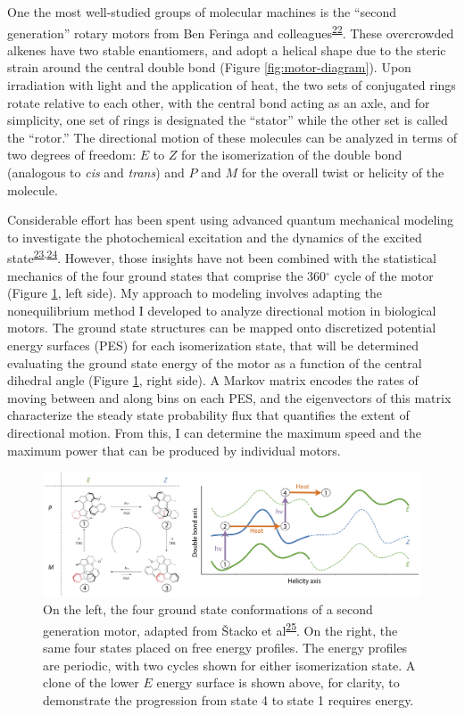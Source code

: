 \documentclass[11pt,notitlepage]{article}
\begin{document}
One the most well-studied groups of molecular machines is the ``second
generation'' rotary motors from Ben Feringa and
colleagues\textsuperscript{\protect\hyperlink{ref-FwAqK1Dt}{22}}. These
overcrowded alkenes have two stable enantiomers, and adopt a helical
shape due to the steric strain around the central double bond (Figure
\ref{fig:motor-diagram}). Upon irradiation with light and the
application of heat, the two sets of conjugated rings rotate relative to
each other, with the central bond acting as an axle, and for simplicity,
one set of rings is designated the ``stator'' while the other set is
called the ``rotor.'' The directional motion of these molecules can be
analyzed in terms of two degrees of freedom: \(E\) to \(Z\) for the
isomerization of the double bond (analogous to \emph{cis} and
\emph{trans}) and \(P\) and \(M\) for the overall twist or helicity of
the molecule.

Considerable effort has been spent using advanced quantum mechanical
modeling to investigate the photochemical excitation and the dynamics of
the excited
state\textsuperscript{\protect\hyperlink{ref-so4s7d25}{23},\protect\hyperlink{ref-N6pRFM85}{24}}.
However, those insights have not been combined with the statistical
mechanics of the four ground states that comprise the 360\(^\circ\)
cycle of the motor (Figure \ref{fig:motors}, left side). My approach to
modeling involves adapting the nonequilibrium method I developed to
analyze directional motion in biological motors. The ground state
structures can be mapped onto discretized potential energy surfaces
(PES) for each isomerization state, that will be determined evaluating
the ground state energy of the motor as a function of the central
dihedral angle (Figure \ref{fig:motors}, right side). A Markov matrix
encodes the rates of moving between and along bins on each PES, and the
eigenvectors of this matrix characterize the steady state probability
flux that quantifies the extent of directional motion. From this, I can
determine the maximum speed and the maximum power that can be produced
by individual motors.

\begin{figure}
\centering
\includegraphics[width=1\textwidth,height=\textheight]{content/images/offset-barriers.png}
\caption{On the left, the four ground state conformations of a second
generation motor, adapted from Štacko et
al\textsuperscript{\protect\hyperlink{ref-mKSNFvW7}{25}}. On the right,
the same four states placed on free energy profiles. The energy profiles
are periodic, with two cycles shown for either isomerization state. A
clone of the lower \(E\) energy surface is shown above, for clarity, to
demonstrate the progression from state 4 to state 1 requires
energy.\label{fig:motors}}
\end{figure}
\end{document}
